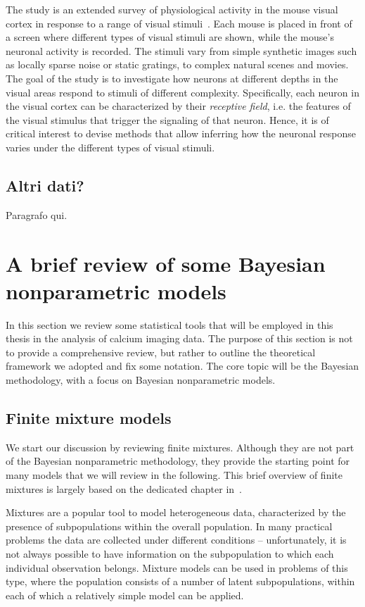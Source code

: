 The study is an extended survey of physiological activity in the mouse visual cortex in response to a range of visual stimuli~\citep{allen_stimulus}. Each mouse is placed in front of a screen where different types of visual stimuli are shown, while the mouse’s neuronal activity is recorded. The stimuli vary from simple synthetic images such as locally sparse noise or static gratings, to complex natural scenes and movies.
The goal of the study is to investigate how neurons at different depths in the visual areas respond to stimuli of different complexity. Specifically, each neuron in the visual cortex can be characterized by their \textit{receptive field}, i.e. the features of the visual stimulus that trigger the signaling of that neuron. Hence, it is of critical interest to devise methods that allow inferring how the neuronal response varies under the different types of visual stimuli. %


\subsection{Altri dati?}
Paragrafo qui.

\section{A brief review of some Bayesian nonparametric models} 
In this section we review some statistical tools that will be employed in this thesis in the analysis of calcium imaging data. The purpose of this section is not to provide a comprehensive review, but rather to outline the theoretical framework we adopted and fix some notation.
The core topic will be the Bayesian methodology, with a focus on Bayesian nonparametric models.

\subsection{Finite mixture models}
We start our discussion by reviewing finite mixtures. Although they are not part of the Bayesian nonparametric methodology, they provide the starting point for many models that we will review in the following. This brief overview of finite mixtures is largely based on the dedicated chapter in~\citet{gelman2013}.

Mixtures are a popular tool to model heterogeneous data, characterized by the presence of subpopulations within the overall population. In many practical problems the data are collected under different conditions -- unfortunately, it is not always possible to have information on the subpopulation to which each individual observation belongs.
Mixture models can be used in problems of this type, where the population consists of a number of latent subpopulations, within each of which a relatively simple model can be applied.

